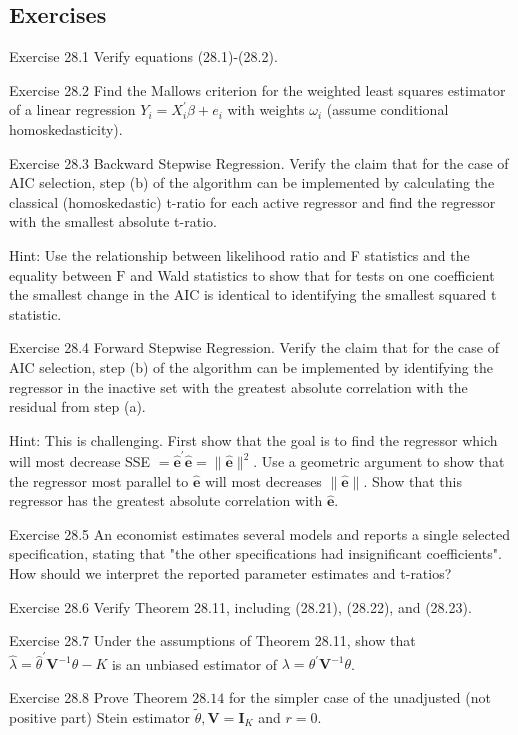 \documentclass[10pt]{article}
\begin{document}
\subsection{Exercises}
Exercise 28.1 Verify equations (28.1)-(28.2).

Exercise 28.2 Find the Mallows criterion for the weighted least squares estimator of a linear regression $Y_{i}=X_{i}^{\prime} \beta+e_{i}$ with weights $\omega_{i}$ (assume conditional homoskedasticity).

Exercise 28.3 Backward Stepwise Regression. Verify the claim that for the case of AIC selection, step (b) of the algorithm can be implemented by calculating the classical (homoskedastic) t-ratio for each active regressor and find the regressor with the smallest absolute t-ratio.

Hint: Use the relationship between likelihood ratio and F statistics and the equality between $\mathrm{F}$ and Wald statistics to show that for tests on one coefficient the smallest change in the AIC is identical to identifying the smallest squared t statistic.

Exercise 28.4 Forward Stepwise Regression. Verify the claim that for the case of AIC selection, step (b) of the algorithm can be implemented by identifying the regressor in the inactive set with the greatest absolute correlation with the residual from step (a).

Hint: This is challenging. First show that the goal is to find the regressor which will most decrease SSE $=\widehat{\boldsymbol{e}}^{\prime} \widehat{\boldsymbol{e}}=\|\widehat{\boldsymbol{e}}\|^{2}$. Use a geometric argument to show that the regressor most parallel to $\widehat{\boldsymbol{e}}$ will most decreases $\|\widehat{\boldsymbol{e}}\|$. Show that this regressor has the greatest absolute correlation with $\widehat{\boldsymbol{e}}$.

Exercise 28.5 An economist estimates several models and reports a single selected specification, stating that "the other specifications had insignificant coefficients". How should we interpret the reported parameter estimates and t-ratios?

Exercise 28.6 Verify Theorem 28.11, including (28.21), (28.22), and (28.23).

Exercise 28.7 Under the assumptions of Theorem 28.11, show that $\hat{\lambda}=\widehat{\theta}^{\prime} \boldsymbol{V}^{-1} \widehat{\theta}-K$ is an unbiased estimator of $\lambda=\theta^{\prime} \boldsymbol{V}^{-1} \theta$.

Exercise 28.8 Prove Theorem $28.14$ for the simpler case of the unadjusted (not positive part) Stein estimator $\widetilde{\theta}, \boldsymbol{V}=\boldsymbol{I}_{K}$ and $r=0$.
\end{document}

